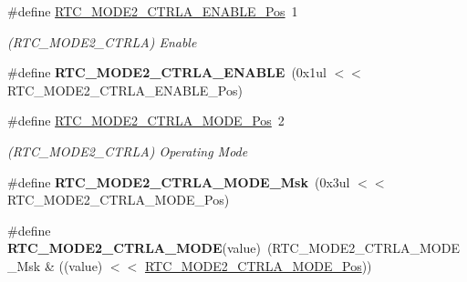 \begin{DoxyCompactItemize}
\item 
\hypertarget{group___s_a_m_l21___r_t_c_ga232da22c7efcb3f19e6c33a31fbf88bd}{}\#define \hyperlink{group___s_a_m_l21___r_t_c_ga232da22c7efcb3f19e6c33a31fbf88bd}{R\+T\+C\+\_\+\+M\+O\+D\+E2\+\_\+\+C\+T\+R\+L\+A\+\_\+\+E\+N\+A\+B\+L\+E\+\_\+\+Pos}~1\label{group___s_a_m_l21___r_t_c_ga232da22c7efcb3f19e6c33a31fbf88bd}

\begin{DoxyCompactList}\small\item\em (R\+T\+C\+\_\+\+M\+O\+D\+E2\+\_\+\+C\+T\+R\+L\+A) Enable \end{DoxyCompactList}\item 
\hypertarget{group___s_a_m_l21___r_t_c_ga9ad0d2c82e40dcf1817c2413a1d4495f}{}\#define {\bfseries R\+T\+C\+\_\+\+M\+O\+D\+E2\+\_\+\+C\+T\+R\+L\+A\+\_\+\+E\+N\+A\+B\+L\+E}~(0x1ul $<$$<$ R\+T\+C\+\_\+\+M\+O\+D\+E2\+\_\+\+C\+T\+R\+L\+A\+\_\+\+E\+N\+A\+B\+L\+E\+\_\+\+Pos)\label{group___s_a_m_l21___r_t_c_ga9ad0d2c82e40dcf1817c2413a1d4495f}

\item 
\hypertarget{group___s_a_m_l21___r_t_c_ga9e63063a02c833995e0bc78142f8122b}{}\#define \hyperlink{group___s_a_m_l21___r_t_c_ga9e63063a02c833995e0bc78142f8122b}{R\+T\+C\+\_\+\+M\+O\+D\+E2\+\_\+\+C\+T\+R\+L\+A\+\_\+\+M\+O\+D\+E\+\_\+\+Pos}~2\label{group___s_a_m_l21___r_t_c_ga9e63063a02c833995e0bc78142f8122b}

\begin{DoxyCompactList}\small\item\em (R\+T\+C\+\_\+\+M\+O\+D\+E2\+\_\+\+C\+T\+R\+L\+A) Operating Mode \end{DoxyCompactList}\item 
\hypertarget{group___s_a_m_l21___r_t_c_ga51ba0623a00751de5cae643f86c160d2}{}\#define {\bfseries R\+T\+C\+\_\+\+M\+O\+D\+E2\+\_\+\+C\+T\+R\+L\+A\+\_\+\+M\+O\+D\+E\+\_\+\+Msk}~(0x3ul $<$$<$ R\+T\+C\+\_\+\+M\+O\+D\+E2\+\_\+\+C\+T\+R\+L\+A\+\_\+\+M\+O\+D\+E\+\_\+\+Pos)\label{group___s_a_m_l21___r_t_c_ga51ba0623a00751de5cae643f86c160d2}

\item 
\hypertarget{group___s_a_m_l21___r_t_c_ga79136b8861a2e263c15ee3d2850fe1d1}{}\#define {\bfseries R\+T\+C\+\_\+\+M\+O\+D\+E2\+\_\+\+C\+T\+R\+L\+A\+\_\+\+M\+O\+D\+E}(value)~(R\+T\+C\+\_\+\+M\+O\+D\+E2\+\_\+\+C\+T\+R\+L\+A\+\_\+\+M\+O\+D\+E\+\_\+\+Msk \& ((value) $<$$<$ \hyperlink{group___s_a_m_l21___r_t_c_ga9e63063a02c833995e0bc78142f8122b}{R\+T\+C\+\_\+\+M\+O\+D\+E2\+\_\+\+C\+T\+R\+L\+A\+\_\+\+M\+O\+D\+E\+\_\+\+Pos}))\label{group___s_a_m_l21___r_t_c_ga79136b8861a2e263c15ee3d2850fe1d1}


\end{DoxyCompactItemize}
